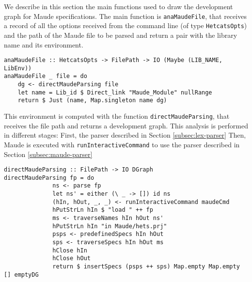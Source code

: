 
We describe in this section the main functions used to draw the
development graph for Maude specifications. The main function is
\verb"anaMaudeFile", that receives a record of all the options received
from the command line (of type \verb"HetcatsOpts") and the path of
the Maude file to be parsed and return a pair with the library
name and its environment.

{\codesize
\begin{verbatim}
anaMaudeFile :: HetcatsOpts -> FilePath -> IO (Maybe (LIB_NAME, LibEnv))
anaMaudeFile _ file = do
    dg <- directMaudeParsing file
    let name = Lib_id $ Direct_link "Maude_Module" nullRange
    return $ Just (name, Map.singleton name dg)
\end{verbatim}
}

This environment is computed with the function
\verb"directMaudeParsing", that receives the file path and returns
a development graph. This analysis is performed in different stages:
First, the parser described in Section \ref{subsec:lex-parser}
Then, Maude is executed with \verb"runInteractiveCommand" to use
the parser described in Section \ref{subsec:maude-parser}

{\codesize
\begin{verbatim}
directMaudeParsing :: FilePath -> IO DGraph
directMaudeParsing fp = do
              ns <- parse fp
              let ns' = either (\ _ -> []) id ns
              (hIn, hOut, _, _) <- runInteractiveCommand maudeCmd
              hPutStrLn hIn $ "load " ++ fp
              ms <- traverseNames hIn hOut ns'
              hPutStrLn hIn "in Maude/hets.prj"
              psps <- predefinedSpecs hIn hOut
              sps <- traverseSpecs hIn hOut ms
              hClose hIn
              hClose hOut
              return $ insertSpecs (psps ++ sps) Map.empty Map.empty [] emptyDG
\end{verbatim}
}








